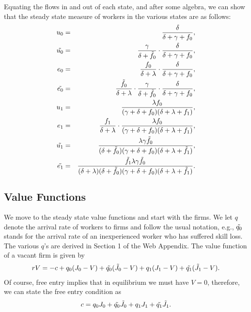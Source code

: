 \documentclass[12pt]{article} %
\theoremstyle{definition}
\begin{document}
Equating the flows in and out of each state, and after some algebra, we can show that the steady state measure of workers in the various states are as follows:
\begin{eqnarray*}
u_0 &=& \frac{\delta}{\delta+\gamma+f_0},\nonumber   \\
\tilde{u_0} &=& \frac{\gamma}{\delta+\Tilde{f_0}} \cdot  \frac{\delta}{\delta+\gamma+f_0}, \nonumber  \\
e_0 &=& \frac{f_0}{\delta+\lambda} \cdot \frac{\delta}{\delta+\gamma+f_0}, \nonumber\\
\Tilde{e_0} &=& \frac{\Tilde{f_0}}{\delta+\lambda} \cdot \frac{\gamma}{\delta + \Tilde{f_0}} \cdot \frac{\delta}{\delta+\gamma+f_0}, \nonumber  \\
 u_1 &=& \frac{\lambda f_0}{(\gamma+\delta+f_0)(\delta+\lambda+f_1)}, \nonumber \\
 e_1 &=& \frac{f_1}{\delta+\lambda} \cdot \frac{\lambda f_0}{(\gamma+\delta+f_0)(\delta+\lambda+f_1)}, \nonumber \\
 \Tilde{u_1} &=& \frac{\lambda \gamma \Tilde{f_0}}{(\delta+\Tilde{f_0})(\gamma+\delta+f_0)(\delta+\lambda+\Tilde{f_1})}, \nonumber \\
 \Tilde{e_1} &=& \frac{\Tilde{f_1}\lambda \gamma \Tilde{f_0}}{(\delta+\lambda)(\delta+\Tilde{f_0})(\gamma+\delta+f_0)(\delta+\lambda+\Tilde{f_1})}. \nonumber 
 \end{eqnarray*}


\subsection{Value Functions}\label{section value functions}
We move to the steady state value functions and start with the firms. We let $q$ denote the arrival rate of workers to firms and follow the usual notation, e.g., $\Tilde{q_0}$ stands for the arrival rate of an inexperienced worker who has suffered skill loss. The various $q$'s are derived in Section 1 of the Web Appendix. The value function of a vacant firm is given by 
\begin{equation}
   rV = -c + q_0 (J_0-V) + \Tilde{q_0}(\Tilde{J_0}-V) + q_1 (J_1-V) + \Tilde{q_1}(\Tilde{J_1}-V).\nonumber 
\end{equation}Of course, free entry implies that in equilibrium we must have $V=0$, therefore, we can state the free entry condition as 
\begin{equation}
   c= q_0 J_0 + \Tilde{q_0}\Tilde{J_0} + q_1 J_1 + \Tilde{q_1}\Tilde{J_1}.\label{eq free entry} 
\end{equation}
\end{document}

